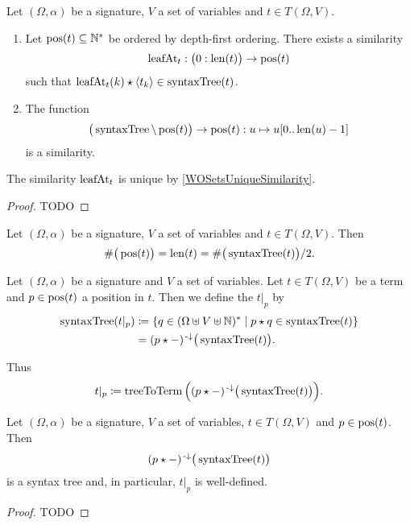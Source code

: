 \begin{proposition} \label{mappingsTermSyntaxTreePositions}
Let $(\Omega, \alpha)$ be a signature, $V$ a set of variables and $t\in T(\Omega, V)$.
\begin{enumerate}
\item Let $\operatorname{pos}(t)\subseteq \mathbb{N}^*$ be ordered by depth-first ordering. There exists a similarity
\[ \operatorname{leafAt}_t: \big(0:\operatorname{len}(t)\big)\to \operatorname{pos}(t) \]
such that $\operatorname{leafAt}_t(k)\star\left\langle t_k \right\rangle\in \operatorname{syntaxTree}(t)$.
\item The function
\[ \big(\operatorname{syntaxTree} \setminus \operatorname{pos}(t)\big) \to \operatorname{pos}(t): u \mapsto u[0..\operatorname{len}(u)-1] \]
is a similarity.
\end{enumerate}
\end{proposition}
The similarity $\operatorname{leafAt}_t$ is unique by \ref{WOSetsUniqueSimilarity}.
\begin{proof}
TODO
\end{proof}
\begin{corollary}
Let $(\Omega, \alpha)$ be a signature, $V$ a set of variables and $t\in T(\Omega, V)$. Then
\[ {\#\big(\operatorname{pos}(t)\big)} = \operatorname{len}(t) = {\#\big(\operatorname{syntaxTree}(t)\big)/2}. \]
\end{corollary}


\begin{definition}
Let $(\Omega, \alpha)$ be a signature and $V$ a set of variables. Let $t\in T(\Omega, V)$ be a term and $p\in \operatorname{pos}(t)$ a position in $t$. Then we define the  $t|_p$ by
\begin{align*}
\operatorname{syntaxTree}(t|_p) &\coloneqq \left\{ q\in (\Omega \uplus V \uplus \mathbb{N})^* \;\middle|\; p\star q \in \operatorname{syntaxTree}(t) \right\} \\
&= (p \star -)^{\text{\hspace{0.15em}-}\downarrow}\big(\operatorname{syntaxTree}(t)\big).
\end{align*}
\end{definition}
Thus
\[ t|_p \coloneqq \operatorname{treeToTerm}\Big((p \star -)^{\text{\hspace{0.15em}-}\downarrow}\big(\operatorname{syntaxTree}(t)\big)\Big). \]

\begin{lemma}
Let $(\Omega, \alpha)$ be a signature, $V$ a set of variables, $t\in T(\Omega, V)$ and $p\in \operatorname{pos}(t)$. Then
\[ (p \star -)^{\text{\hspace{0.15em}-}\downarrow}\big(\operatorname{syntaxTree}(t)\big) \]
is a syntax tree and, in particular, $t|_p$ is well-defined.
\end{lemma}
\begin{proof}
TODO
\end{proof}

